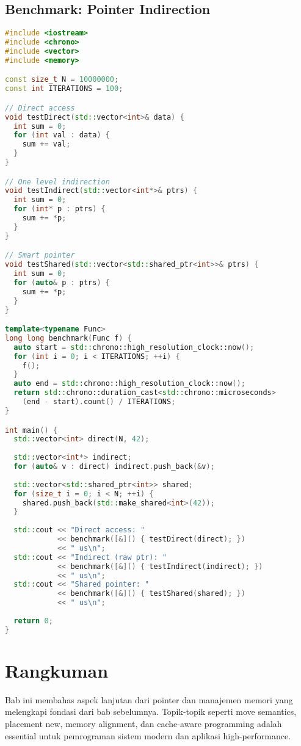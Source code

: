 \documentclass[../main.tex]{subfiles}
\begin{document}
\subsection{Benchmark: Pointer Indirection}
\begin{lstlisting}[language=C++, caption={Impact of pointer indirection}]
#include <iostream>
#include <chrono>
#include <vector>
#include <memory>

const size_t N = 10000000;
const int ITERATIONS = 100;

// Direct access
void testDirect(std::vector<int>& data) {
  int sum = 0;
  for (int val : data) {
    sum += val;
  }
}

// One level indirection
void testIndirect(std::vector<int*>& ptrs) {
  int sum = 0;
  for (int* p : ptrs) {
    sum += *p;
  }
}

// Smart pointer
void testShared(std::vector<std::shared_ptr<int>>& ptrs) {
  int sum = 0;
  for (auto& p : ptrs) {
    sum += *p;
  }
}

template<typename Func>
long long benchmark(Func f) {
  auto start = std::chrono::high_resolution_clock::now();
  for (int i = 0; i < ITERATIONS; ++i) {
    f();
  }
  auto end = std::chrono::high_resolution_clock::now();
  return std::chrono::duration_cast<std::chrono::microseconds>
    (end - start).count() / ITERATIONS;
}

int main() {
  std::vector<int> direct(N, 42);
  
  std::vector<int*> indirect;
  for (auto& v : direct) indirect.push_back(&v);
  
  std::vector<std::shared_ptr<int>> shared;
  for (size_t i = 0; i < N; ++i) {
    shared.push_back(std::make_shared<int>(42));
  }
  
  std::cout << "Direct access: " 
            << benchmark([&]() { testDirect(direct); }) 
            << " us\n";
  std::cout << "Indirect (raw ptr): " 
            << benchmark([&]() { testIndirect(indirect); }) 
            << " us\n";
  std::cout << "Shared pointer: " 
            << benchmark([&]() { testShared(shared); }) 
            << " us\n";
  
  return 0;
}
\end{lstlisting}

\section{Rangkuman}
Bab ini membahas aspek lanjutan dari pointer dan manajemen memori yang melengkapi fondasi dari bab sebelumnya. Topik-topik seperti move semantics, placement new, memory alignment, dan cache-aware programming adalah essential untuk pemrograman sistem modern dan aplikasi high-performance.
\end{document}
